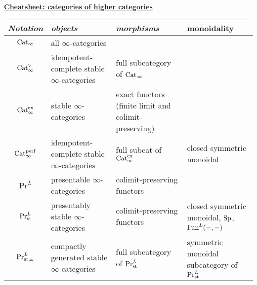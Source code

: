 \begin{mdframed}[style=cheatsheet]
\begin{center}

\underline{\textbf{Cheatsheet: categories of higher categories}}
    \small
        \begin{tabular}{| c || p{3cm} | p{3cm}| p{3cm} |}
        \hline
        \textit{Notation} & \textit{objects} & \textit{morphisms} & monoidality \\
        \hline\hline
        $\mathrm{Cat}_\infty$ & all $\infty$-categories & & \\
        \hline
        $\mathrm{Cat}_\infty^\vee$ & idempotent-complete stable $\infty$-categories & full subcategory of $\mathrm{Cat}_\infty$ & \\
        \hline
        $\mathrm{Cat}_\infty^\text{ex}$ & stable $\infty$-categories & exact functors (finite limit and colimit-preserving) & \\
        \hline
        $\mathrm{Cat}_\infty^{\mathrm{perf}}$ & idempotent-complete stable $\infty$-categories & full subcat of $\mathrm{Cat}_\infty^\text{ex}$ & closed symmetric monoidal\\
        \hline
        $\Pr^L$ & presentable $\infty$-categories & colimit-preserving functors & \\
        \hline
        $\mathrm{Pr}^L_{\mathrm{st}}$ & presentably stable $\infty$-categories & colimit-preserving functors & closed symmetric monoidal, $\mathrm{Sp}$, $\mathrm{Fun}^L(-,-)$\\
        \hline
        $\mathrm{Pr}^L_{\mathrm{st},\omega}$ & compactly generated stable $\infty$-categories & full subcategory of $\mathrm{Pr}^L_{\mathrm{st}}$ & symmetric monoidal subcategory of $\mathrm{Pr}^L_{\mathrm{st}}$\\
        \hline
        \end{tabular}
\end{center}
\end{mdframed}
